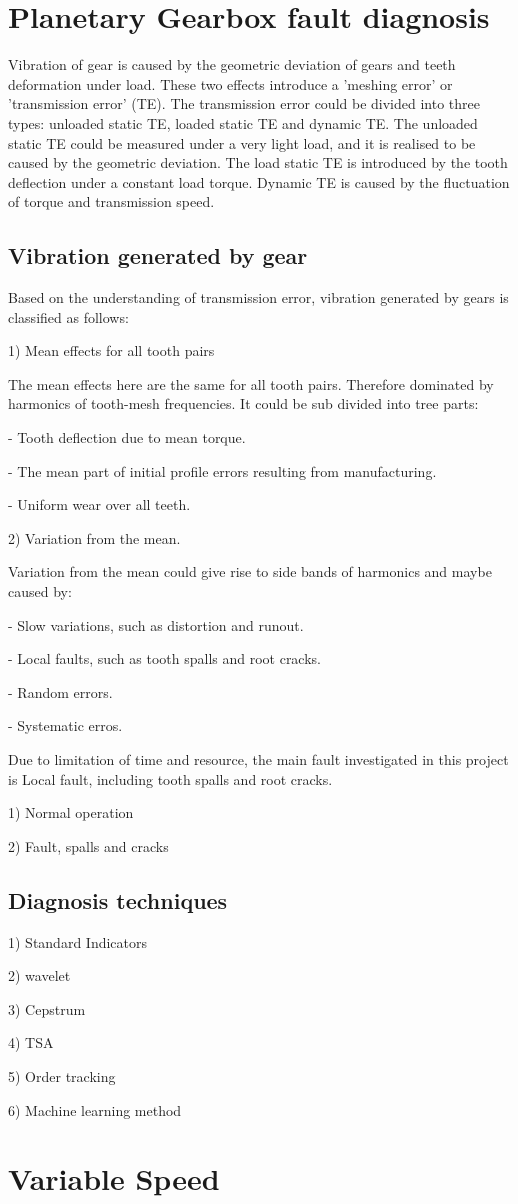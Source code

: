 \section{Planetary Gearbox fault diagnosis}

Vibration of gear is caused by the geometric deviation of gears and teeth deformation under load. These two effects introduce a 'meshing error' or 'transmission error' (TE). \cite{VBCM}The transmission error could be divided into three types: unloaded static TE, loaded static TE and dynamic TE. The unloaded static TE could be measured under a very light load, and it is realised to be caused by the geometric deviation. The load static TE is introduced by the tooth deflection under a constant load torque. Dynamic TE is caused by the fluctuation of torque and transmission speed.


\subsection{Vibration generated by gear}

Based on the understanding of transmission error, vibration generated by gears is classified as follows: \cite{VBCM}

1) Mean effects for all tooth pairs

The mean effects here are the same for all tooth pairs. Therefore dominated by harmonics of tooth-mesh frequencies. It could be sub divided into tree parts: 

	- Tooth deflection due to mean torque.
		
	- The mean part of initial profile errors resulting from manufacturing.	
	
	- Uniform wear over all teeth.

2) Variation from the mean.

Variation from the mean could give rise to side bands of harmonics and maybe caused by:

	- Slow variations, such as distortion and runout.	
	
	- Local faults, such as tooth spalls and root cracks.	
	
	- Random errors.	
	
	- Systematic erros.

Due to limitation of time and resource, the main fault investigated in this project is Local fault, including tooth spalls and root cracks.

1)	Normal operation

2)	Fault, spalls and cracks

\subsection{Diagnosis techniques}

1)	Standard Indicators

2)	wavelet

3)	Cepstrum

4)	TSA

5)	Order tracking

6)	Machine learning method


\section{Variable Speed}
